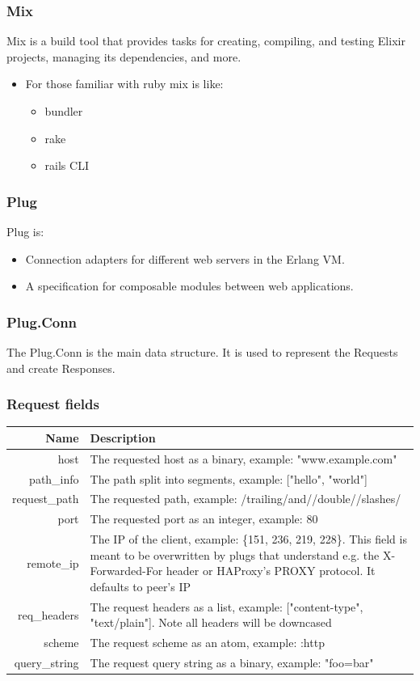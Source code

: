 \documentclass{beamer}
\begin{document}
\begin{frame}
\frametitle{Mix}
Mix is a build tool that provides tasks for creating, compiling, and testing Elixir projects, managing its dependencies, and more.

\begin{itemize}
\item{For those familiar with ruby mix is like:}
\begin{itemize}
\item{bundler}
\item{rake}
\item{rails CLI}
\end{itemize}
\end{itemize}
\end{frame}

\begin{frame}
\frametitle{Plug}
Plug is: \pause

\begin{itemize}
\item{Connection adapters for different web servers in the Erlang VM.} \pause
\item{A specification for composable modules between web applications.}
\end{itemize}
\end{frame}

\begin{frame}
\frametitle{Plug.Conn}
  The Plug.Conn is the main data structure. It is used to represent the \alert{Requests} and create \alert{Responses}.
\end{frame}

\begin{frame}
  \frametitle{Request fields}

  \begin{flushleft}
  \tiny
  \begin{tabular}{|r|p{3.5in}|}
  \hline
  \textbf{Name} & \textbf{Description} \\ \hline
  host          & The requested host as a binary, example: "www.example.com" \\
  path\_info    & The path split into segments, example: ["hello", "world"] \\
  request\_path & The requested path, example: /trailing/and//double//slashes/ \\
  port          & The requested port as an integer, example: 80 \\
  remote\_ip    & The IP of the client, example: \{151, 236, 219, 228\}. This field is meant to be overwritten by plugs that understand e.g. the X-Forwarded-For header or HAProxy’s PROXY protocol. It defaults to peer’s IP \\
  req\_headers  & The request headers as a list, example: [{"content-type", "text/plain"}]. Note all headers will be downcased \\
  scheme        & The request scheme as an atom, example: :http \\
  query\_string & The request query string as a binary, example: "foo=bar" \\ \hline
  \end{tabular}
  \end{flushleft}
\end{frame}
\end{document}
